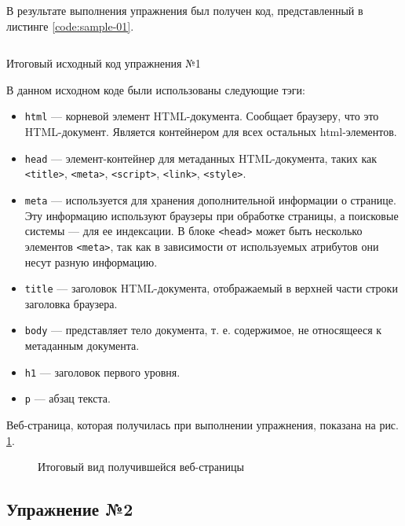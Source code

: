 \documentclass[a4paper, 14pt]{extarticle}
\newenvironment{code}{\captionsetup{type=listing}}{}
\begin{document}
В результате выполнения упражнения был получен код, представленный в листинге
\ref{code:sample-01}.

\begin{code}
  \label{code:sample-01}
  \inputminted{html}{../task-1/Sample01.html}
  \caption{Итоговый исходный код упражнения №1}
\end{code}

В данном исходном коде были использованы следующие тэги:
\begin{itemize}
  \item \texttt{html} --- корневой элемент HTML-документа. Сообщает браузеру,
  что это HTML-документ. Является контейнером для всех остальных
  html-элементов.
  \item \texttt{head} --- элемент-контейнер для метаданных HTML-документа,
  таких как \texttt{<title>}, \texttt{<meta>}, \texttt{<script>},
  \texttt{<link>}, \texttt{<style>}.
  \item \texttt{meta} --- используется для хранения дополнительной информации о
  странице. Эту информацию используют браузеры при обработке страницы, а
  поисковые системы — для ее индексации. В блоке \texttt{<head>} может
  быть несколько элементов \texttt{<meta>}, так как в зависимости от
  используемых атрибутов они несут разную информацию.
  \item \texttt{title} --- заголовок HTML-документа, отображаемый в верхней
  части строки заголовка браузера.
  \item \texttt{body} --- представляет тело документа, т. е. содержимое, не
  относящееся к метаданным документа.
  \item \texttt{h1} --- заголовок первого уровня.
  \item \texttt{p} --- абзац текста.
\end{itemize}

Веб-страница, которая получилась при выполнении упражнения, показана на рис.
\ref{fig:task-1}.

\begin{figure}[H]
  \centering
  \caption{Итоговый вид получившейся веб-страницы}
  \label{fig:task-1}
\end{figure}

\subsection{Упражнение №2}
\end{document}
